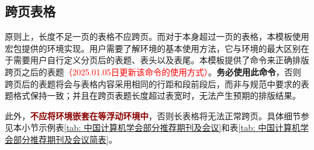 \documentclass[print, doctor, vlined]{DissertUESTC}
\begin{document}
	
	\clearpage
	\subsection{跨页表格}
	
	原则上，长度不足一页的表格不应跨页。而对于本身超过一页的表格，本模板使用\href{https://mirrors.tuna.tsinghua.edu.cn/CTAN/macros/latex/required/tools/longtable.pdf}{}宏包提供的环境实现。用户需要了解环境的基本使用方法，它与环境的最大区别在于需要用户自行定义分页后的表题、表头以及表尾。本模板提供了命令来正确排版跨页之后的表题\textcolor{red}{（2025.01.05日更新该命令的使用方式）}。\textbf{务必使用此命令}，否则跨页后的表题将会与表格内容采用相同的行距和段前段后，而非与规范中要求的表题格式保持一致；并且在跨页表题长度超过表宽时，无法产生预期的排版结果。
	
	此外，\textbf{\textcolor{DarkRed}{不应将环境嵌套在等浮动环境中}}，否则长表格将无法正常跨页。具体细节参见本小节示例表\ref{tab: 中国计算机学会部分推荐期刊及会议}和表\ref{tab: 中国计算机学会部分推荐期刊及会议简表}。
	
\end{document}
